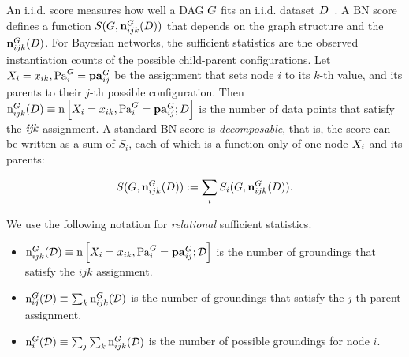 \documentclass{article}
\begin{document}
%
%
An i.i.d. score %
measures how well a DAG $G$ fits an i.i.d. dataset $D$~\cite{Chickering2002}. %
A BN score defines a function $S(G,\boldsymbol{\mathrm{n}}^{G}_{ijk}(D))$ that depends on the graph structure 
 and the  $\boldsymbol{\mathrm{n}}^{G}_{ijk}(D)$. For Bayesian networks, the sufficient statistics are the observed instantiation counts of the possible child-parent configurations. %
Let $X_{i} = x_{ik},\mathrm{Pa}_{i}^{G}=\mathbf{pa}_{ij}^{G}$ be the assignment that sets node $i$ to its $k$-th value, and its parents to their $j$-th possible configuration. Then $\mathrm{n}^{G}_{ijk}(D) \equiv \mathrm{n}\left[X_{i} = x_{ik},\mathrm{Pa}_{i}^{G}=\mathbf{pa}_{ij}^{G};D\right]$ is the number of data points that satisfy the $\it{ijk}$ assignment. A standard BN score is {\em decomposable}, that is, the score  can be written as a sum of  $S_{i}$, each of which is a function only of one node $X_{i}$ and its parents:

\begin{equation} \label{eq:decomposable}
S(G,\boldsymbol{\mathrm{n}}^{G}_{ijk}(D)) := \sum_{i} S_{i}(G,\boldsymbol{\mathrm{n}}^{G}_{ijk}(D)).
\end{equation}
 

We use the following notation for {\em relational} sufficient statistics.

\begin{itemize}
\item $\mathrm{n}^{G}_{ijk}(\mathcal{D}) \equiv \mathrm{n}\left[X_{i} = x_{ik},\mathrm{Pa}_{i}^{G}=\mathbf{pa}_{ij}^{G};\mathcal{D}\right]$ is the number of groundings that satisfy the $ijk$ assignment.
\item $\mathrm{n}^{G}_{ij}(\mathcal{D}) \equiv \sum_{k} \mathrm{n}^{G}_{ijk}(\mathcal{D})$ is the number of groundings that satisfy the $j$-th parent assignment.
\item $\mathrm{n}^{G}_{i}(\mathcal{D}) \equiv \sum_{j}\sum_{k} \mathrm{n}^{G}_{ijk}(\mathcal{D})$ is the number of possible groundings for node $i$.
\end{itemize}
\end{document}
